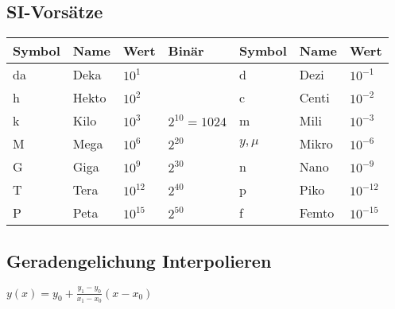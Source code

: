\subsection{SI-Vorsätze}
\renewcommand{\arraystretch}{1.2}
\begin{tabularx}{\textwidth}{|X|X|X|X|X|X|l|}
	\hline
\textbf{Symbol}	&\textbf{Name}  &\textbf{Wert}  &\textbf{Binär}  &\textbf{Symbol}  &\textbf{Name}  &\textbf{Wert}
 \\ \hline 
da	& Deka & $ 10^1 $  &    			  &d  &Dezi  &$ 10^{-1} $ 
\\ \hline
h	&Hekto  &$ 10^2 $  &                  & c & Centi & $ 10^{-2} $ 
\\ \hline
k	&Kilo  & $ 10^3 $  &$ 2^{10}=1024  $  & m &  Mili& $ 10^{-3} $ 
\\ \hline
M	& Mega &$ 10^6 $   & $ 2^20 $       & $ y, \mu $ & Mikro & $ 10^{-6} $
\\ \hline
G  &Giga  &$ 10^9 $    &$ 2^30 $          & n &  Nano&$ 10^{-9} $ 
\\ \hline
T	& Tera & $ 10^{12} $& $ 2^{40} $      &p  & Piko & $ 10^{-12} $
\\ \hline
P	&Peta	&$ 10^{15} $&$ 2^{50} $	      &f&	Femto	&$ 10^{-15} $
\\ \hline

\end{tabularx} 

\subsection{Geradengelichung Interpolieren}
$ y(x)=y_0 + \frac{y_1 - y_0}{x_1 - x_0}(x-x_0) $
\clearpage

